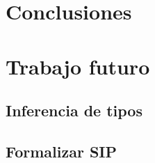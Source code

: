 \documentclass[]{report}
\begin{document}
	\section{Conclusiones}
	
	
	\section{Trabajo futuro}
	\subsection{Inferencia de tipos}
	\subsection{Formalizar SIP}
	
	
	\printbibliography
	
\end{document}

